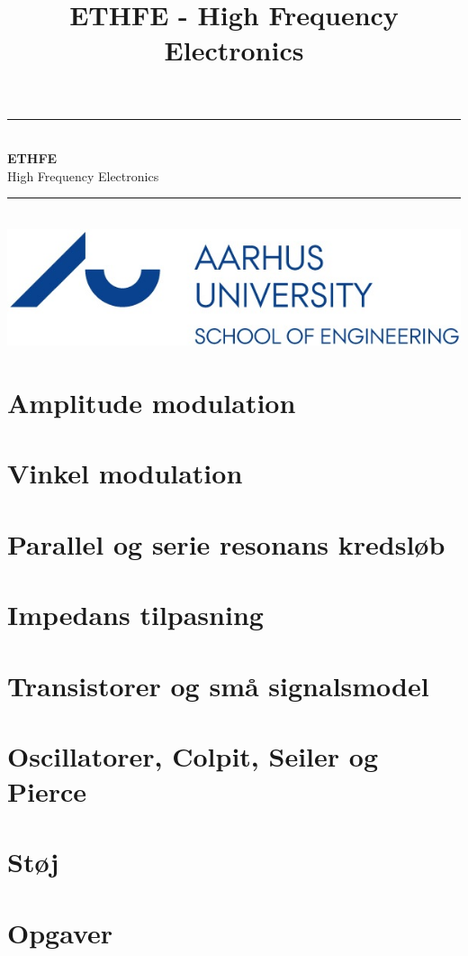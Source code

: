 \documentclass[12pt,a4paper,danish,oneside]{book}
\title{ETHFE - High Frequency Electronics}
\newcommand{\HRule}{\rule{\linewidth}{0.5mm}}
\begin{document}
\begin{titlepage}
	\clearpage\thispagestyle{empty}

	\begin{center}
		\HRule \\[0.4cm]
		{\huge \bfseries ETHFE} \\[.3cm] {\huge High Frequency Electronics}\\[0cm]
		\HRule \\[3.4cm]
		\includegraphics[width=0.5\linewidth]{graphics/au}
	\end{center}
	\renewcommand{\contentsname}{Indholdsfortegnelse}
	\tableofcontents

\end{titlepage}

 

\chapter{Amplitude modulation}


\chapter{Vinkel modulation}


\chapter{Parallel og serie resonans kredsløb}


\chapter{Impedans tilpasning}


\chapter{Transistorer og små signalsmodel}


\chapter{Oscillatorer, Colpit, Seiler og Pierce}


\chapter{Støj}


\chapter{Opgaver}




\end{document}
